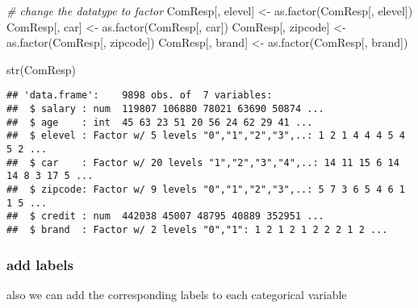\documentclass[
]{article}
\newenvironment{Shaded}{\begin{snugshade}}{\end{snugshade}}
\newcommand{\CommentTok}[1]{\textcolor[rgb]{0.56,0.35,0.01}{\textit{#1}}}
\newcommand{\FunctionTok}[1]{\textcolor[rgb]{0.00,0.00,0.00}{#1}}
\newcommand{\NormalTok}[1]{#1}
\newcommand{\OtherTok}[1]{\textcolor[rgb]{0.56,0.35,0.01}{#1}}
\newcommand{\StringTok}[1]{\textcolor[rgb]{0.31,0.60,0.02}{#1}}
\begin{document}
\begin{Shaded}
\begin{Highlighting}[]
\CommentTok{\# change the datatype to factor }
\NormalTok{ComResp[, }\StringTok{\textquotesingle{}elevel\textquotesingle{}}\NormalTok{] }\OtherTok{\textless{}{-}} \FunctionTok{as.factor}\NormalTok{(ComResp[, }\StringTok{\textquotesingle{}elevel\textquotesingle{}}\NormalTok{])}
\NormalTok{ComResp[, }\StringTok{\textquotesingle{}car\textquotesingle{}}\NormalTok{] }\OtherTok{\textless{}{-}} \FunctionTok{as.factor}\NormalTok{(ComResp[, }\StringTok{\textquotesingle{}car\textquotesingle{}}\NormalTok{])}
\NormalTok{ComResp[, }\StringTok{\textquotesingle{}zipcode\textquotesingle{}}\NormalTok{] }\OtherTok{\textless{}{-}} \FunctionTok{as.factor}\NormalTok{(ComResp[, }\StringTok{\textquotesingle{}zipcode\textquotesingle{}}\NormalTok{])}
\NormalTok{ComResp[, }\StringTok{\textquotesingle{}brand\textquotesingle{}}\NormalTok{] }\OtherTok{\textless{}{-}} \FunctionTok{as.factor}\NormalTok{(ComResp[, }\StringTok{\textquotesingle{}brand\textquotesingle{}}\NormalTok{])}

\FunctionTok{str}\NormalTok{(ComResp)}
\end{Highlighting}
\end{Shaded}

\begin{verbatim}
## 'data.frame':    9898 obs. of  7 variables:
##  $ salary : num  119807 106880 78021 63690 50874 ...
##  $ age    : int  45 63 23 51 20 56 24 62 29 41 ...
##  $ elevel : Factor w/ 5 levels "0","1","2","3",..: 1 2 1 4 4 4 5 4 5 2 ...
##  $ car    : Factor w/ 20 levels "1","2","3","4",..: 14 11 15 6 14 14 8 3 17 5 ...
##  $ zipcode: Factor w/ 9 levels "0","1","2","3",..: 5 7 3 6 5 4 6 1 1 5 ...
##  $ credit : num  442038 45007 48795 40889 352951 ...
##  $ brand  : Factor w/ 2 levels "0","1": 1 2 1 2 1 2 2 2 1 2 ...
\end{verbatim}

\hypertarget{add-labels}{%
\subsubsection{add labels}\label{add-labels}}

also we can add the corresponding labels to each categorical variable
\end{document}
